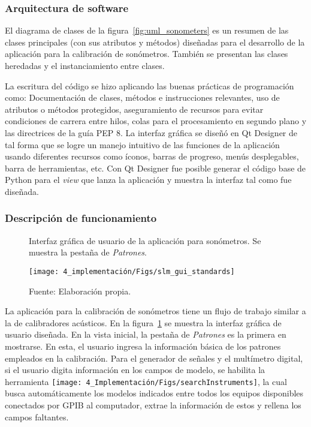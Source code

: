 \subsubsection{Arquitectura de software}
El diagrama de clases de la figura~\ref{fig:uml_sonometers} es un resumen de las clases principales (con sus atributos y métodos) diseñadas para el desarrollo de la aplicación para la calibración de sonómetros.
También se presentan las clases heredadas y el instanciamiento entre clases.

La escritura del código se hizo aplicando las buenas prácticas de programación como: Documentación de clases, métodos e instrucciones relevantes, uso de atributos o métodos protegidos, aseguramiento de recursos para evitar condiciones de carrera entre hilos, colas para el procesamiento en segundo plano y las directrices de la guía PEP 8.
La interfaz gráfica se diseñó en Qt Designer de tal forma que se logre un manejo intuitivo de las funciones de la aplicación usando diferentes recursos como íconos, barras de progreso, menús desplegables, barra de herramientas, etc.
Con Qt Designer fue posible generar el código base de Python para el \emph{view} que lanza la aplicación y muestra la interfaz tal como fue diseñada.

\subsubsection{Descripción de funcionamiento}

\begin{figure}[!h]
    \centering
    \caption{Interfaz gráfica de usuario de la aplicación para sonómetros. Se muestra la pestaña de \emph{Patrones}.}
    \label{fig:slm_gui_standards}
    \texttt{[image: 4\_implementación/Figs/slm\_gui\_standards]}
    \caption*{\footnotesize Fuente: Elaboración propia.}
\end{figure}

La aplicación para la calibración de sonómetros tiene un flujo de trabajo similar a la de calibradores acústicos.
En la figura~\ref{fig:slm_gui_standards} se muestra la interfaz gráfica de usuario diseñada.
En la vista inicial, la pestaña de \emph{Patrones} es la primera en mostrarse.
En esta, el usuario ingresa la información básica de los patrones empleados en la calibración.
Para el generador de señales y el multímetro digital, si el usuario digita información en los campos de modelo, se habilita la herramienta \texttt{[image: 4\_Implementación/Figs/searchInstruments]}, la cual busca automáticamente los modelos indicados entre todos los equipos disponibles conectados por GPIB al computador, extrae la información de estos y rellena los campos faltantes.

